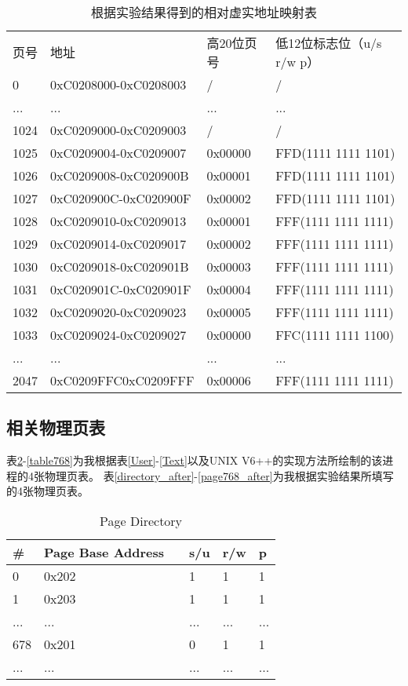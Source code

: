 \begin{table}[htbp]
\centering
 \begin{tabular}{llll}\toprule
    页号 & 地址    & 高20位页号  & 低12位标志位（u/s r/w p）\\
    0           &0xC0208000-0xC0208003&  / &  / \\
    ...           &...&  ... &  ... \\
    1024 &0xC0209000-0xC0209003&  / &  / \\
    1025&0xC0209004-0xC0209007&0x00000&FFD(1111 1111 1101)\\
    1026&0xC0209008-0xC020900B&0x00001&FFD(1111 1111 1101)\\
    1027&0xC020900C-0xC020900F&0x00002&FFD(1111 1111 1101)\\
    1028&0xC0209010-0xC0209013&0x00001&FFF(1111 1111 1111)\\
    1029&0xC0209014-0xC0209017&0x00002&FFF(1111 1111 1111)\\
    1030&0xC0209018-0xC020901B&0x00003&FFF(1111 1111 1111)\\
    1031&0xC020901C-0xC020901F&0x00004&FFF(1111 1111 1111)\\
    1032&0xC0209020-0xC0209023&0x00005&FFF(1111 1111 1111)\\
    1033&0xC0209024-0xC0209027&0x00000&FFC(1111 1111 1100)\\
    ...           &...&  ... &  ... \\
    2047&0xC0209FFC\-0xC0209FFF&0x00006&FFF(1111 1111 1111)\\
   \bottomrule
\end{tabular}
\caption{根据实验结果得到的相对虚实地址映射表}\label{relative_after}
\end{table}

\subsection{相关物理页表}
表\ref{directory}-\ref{table768}为我根据表\ref{User}-\ref{Text}以及UNIX V6++的实现方法所绘制的该进程的4张物理页表。
表\ref{directory_after}-\ref{page768_after}为我根据实验结果所填写的4张物理页表。
\begin{table}[htbp]
    \centering
 \begin{tabular}{llllll}\toprule
 \#&Page Base Address      & &s/u&r/w&p        \\\midrule
 0&0x202        & &1&1&1        \\
 1&0x203        & &1&1&1        \\
 ...&...      & &...&...&...        \\
 678&0x201        & &0&1&1        \\
 ...&...      & &...&...&...        \\
   \bottomrule
\end{tabular}
\caption{Page Directory}\label{directory}
\end{table}

